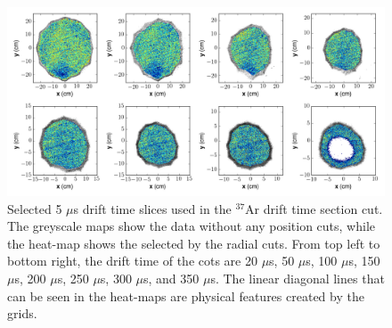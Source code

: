 \begin{figure}[h!]
\centering
  \includegraphics[width=\textwidth]{Figures/xycut_xy.png}
\caption{Selected 5 $\mu$s drift time slices used in the $^{37}$Ar drift time section cut. The greyscale maps show the data without any position cuts, while the heat-map shows the selected by the radial cuts. From top left to bottom right, the drift time of the cots are 20 $\mu$s, 50 $\mu$s, 100 $\mu$s, 150 $\mu$s, 200 $\mu$s, 250 $\mu$s, 300 $\mu$s, and 350 $\mu$s. The linear diagonal lines that can be seen in the heat-maps are physical features created by the grids.}
\label{fig:xycut_xy}
\end{figure}

